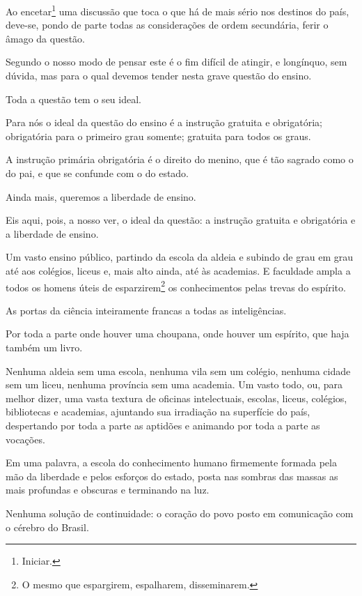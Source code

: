 \asterisc{}

Ao encetar\footnote{Iniciar.} uma discussão que toca o que há de mais
sério nos destinos do país, deve-se, pondo de parte todas as
considerações de ordem secundária, ferir o âmago da questão.

Segundo o nosso modo de pensar este é o fim difícil de atingir, e
longínquo, sem dúvida, mas para o qual devemos tender nesta grave
questão do ensino.

Toda a questão tem o seu ideal.

Para nós o ideal da questão do ensino é a instrução gratuita e
obrigatória; obrigatória para o primeiro grau somente; gratuita para
todos os graus.

A instrução primária obrigatória é o direito do menino, que é tão
sagrado como o do pai, e que se confunde com o do estado.

Ainda mais, queremos a liberdade de ensino.

Eis aqui, pois, a nosso ver, o ideal da questão: a instrução gratuita e
obrigatória e a liberdade de ensino.

Um vasto ensino público, partindo da escola da aldeia e subindo de grau
em grau até aos colégios, liceus e, mais alto ainda, até às academias. E
faculdade ampla a todos os homens úteis de esparzirem\footnote{O mesmo
  que espargirem, espalharem, disseminarem.} os conhecimentos pelas
trevas do espírito.

As portas da ciência inteiramente francas a todas as inteligências.

Por toda a parte onde houver uma choupana, onde houver um espírito, que
haja também um livro.

Nenhuma aldeia sem uma escola, nenhuma vila sem um colégio, nenhuma
cidade sem um liceu, nenhuma província sem uma academia. Um vasto todo,
ou, para melhor dizer, uma vasta textura de oficinas intelectuais,
escolas, liceus, colégios, bibliotecas e academias, ajuntando sua
irradiação na superfície do país, despertando por toda a parte as
aptidões e animando por toda a parte as vocações.

Em uma palavra, a escola do conhecimento humano firmemente formada pela
mão da liberdade e pelos esforços do estado, posta nas sombras das
massas as mais profundas e obscuras e terminando na luz.

Nenhuma solução de continuidade: o coração do povo posto em comunicação
com o cérebro do Brasil.

